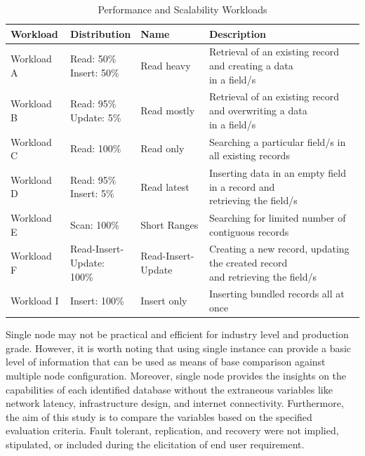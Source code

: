 \documentclass[5p]{elsarticle}
\begin{document}
\begin{table}[t]
    \centering															
    \caption{Performance and Scalability Workloads}
     \label{table.workload.definition}
     \begin{tabular}{llll}
        \toprule
        Workload & Distribution & Name & Description\\
        \hline
        \rule{0pt}{20pt}Workload A &\makecell[l]{ Read: 50\%  \\ Insert: 50\%} & Read heavy        & \makecell[l]{Retrieval of an existing record and creating a data \\in a field/s} \\
        \rule{0pt}{20pt}Workload B &\makecell[l]{ Read: 95\%  \\ Update: 5\%}  & Read mostly       & \makecell[l]{Retrieval of an existing record and overwriting a data \\in a field/s} \\
        \rule{0pt}{20pt}Workload C &\makecell[l]{ Read: 100\% \\ }             & Read only         & Searching a particular field/s in all existing records \\
        \rule{0pt}{20pt}Workload D &\makecell[l]{ Read: 95\%  \\ Insert: 5\%}  & Read latest       & \makecell[l]{Inserting data in an empty field in a record and \\retrieving the field/s} \\
        \rule{0pt}{20pt}Workload E & Scan: 100\%                               & Short Ranges      & Searching for limited number of contiguous records \\
        \rule{0pt}{20pt}Workload F &\makecell[l]{ Read-Insert-\\Update: 100\%} & Read-Insert-Update& \makecell[l]{Creating a new record, updating the created record \\and retrieving the field/s} \\
        \rule{0pt}{12pt}Workload I &\makecell[l]{ Insert: 100\%\\ }            & Insert only       & Inserting bundled records all at once \\
        \hline
    \end{tabular}															
\end{table}															

													

Single node may not be practical and efficient for industry level and production grade. 
However, it is worth noting that using single instance can provide a basic level of information that can
be used as means of base comparison against multiple node configuration. 
Moreover, single node provides the insights on the capabilities of each identified database without 
the extraneous variables like network latency, infrastructure design, and internet connectivity. 
Furthermore, the aim of this study is to compare the variables based on the specified evaluation criteria.
Fault tolerant, replication, and recovery were not implied, stipulated, or included during the elicitation of end user requirement. 
\end{document}
